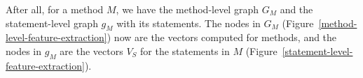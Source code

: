 After all, for a method $M$, we have the method-level graph $G_{M}$
and the statement-level graph $g_{M}$ with its statements. The nodes
in $G_M$ (Figure~\ref{method-level-feature-extraction}) now are the
vectors computed for methods, and the nodes in $g_M$ are the vectors
$V_S$ for the statements in $M$
(Figure~\ref{statement-level-feature-extraction}).






